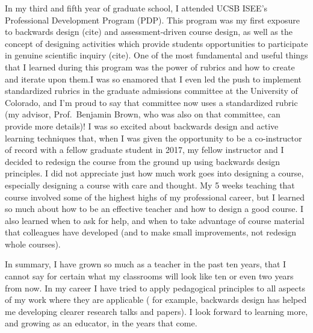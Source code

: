 \documentclass[11pt]{article}
\begin{document}
In my third and fifth year of graduate school, I attended UCSB ISEE’s Professional Development Program (PDP). 
This program was my first exposure to backwards design (cite) and assessment-driven course design, as well as the concept of designing activities which provide students opportunities to participate in genuine scientific inquiry (cite). 
One of the most fundamental and useful things that I learned during this program was the power of rubrics and how to create and iterate upon them.I was so enamored that I even led the push to implement standardized rubrics in the graduate admissions committee at the University of Colorado, and I’m proud to say that committee now uses a standardized rubric (my advisor, Prof.~Benjamin Brown, who was also on that committee, can provide more details)! I was so excited about backwards design and active learning techniques that, when I was given the opportunity to be a co-instructor of record with a fellow graduate student in 2017, my fellow instructor and I decided to redesign the course from the ground up using backwards design principles. 
I did not appreciate just how much work goes into designing a course, especially designing a course with care and thought. 
My 5 weeks teaching that course involved some of the highest highs of my professional career, but I learned so much about how to be an effective teacher and how to design a good course. 
I also learned when to ask for help, and when to take advantage of course material that colleagues have developed (and to make small improvements, not redesign whole courses).

In summary, I have grown so much as a teacher in the past ten years, that I cannot say for certain what my classrooms will look like ten or even two years from now. 
In my career I have tried to apply pedagogical principles to all aspects of my work where they are applicable ( for example, backwards design has helped me developing clearer research talks and papers). 
I look forward to learning more, and growing as an educator, in the years that come.

{\scriptsize

}
\end{document}
